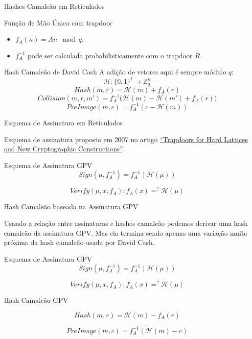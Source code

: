 \documentclass{beamer}
\begin{document}
\begin{frame}{Hashes Camaleão em Reticulados}

\begin{block}{Função de Mão Única com trapdoor}
\begin{itemize}
    \item $f_A(n) = An \mod q$.
    \item $f_A^{-1}$ pode ser calculada probabilisticamente com o
    trapdoor $R$.
\end{itemize}
\end{block}
    
    \begin{block}{Hash Camaleão de David Cash}
    A adição de vetores aqui é sempre módulo $q$:
    $$
    \mathcal{H}:\{0,1\}^l \rightarrow \mathbb{Z}_q^{n}
    $$
    $$
    Hash(m, r) = \mathcal{H}(m) + f_A(r)
    $$
    $$
    Collision(m, r, m') = f_A^{-1}\big(\mathcal{H}(m)-\mathcal{H}(m')+f_A(r)\big)
    $$
    $$
    PreImage(m, c) = f_A^{-1}(c - \mathcal{H}(m))
    $$
    \end{block}
\end{frame}

\begin{frame}{Esquema de Assinatura em Reticulados}

Esquema de assinatura proposto em 2007 no artigo \href{https://www.cs.toronto.edu/~vinodv/trapcvp.pdf}{``Trapdoors for Hard Lattices and New Cryptographic Constructions''}.

    \begin{block}{Esquema de Assinatura GPV}
    $$
    Sign(\mu, f_A^{-1}) = f_A^{-1}(\mathcal{H}(\mu))
    $$
    
    $$
    Verify(\mu, x, f_A):  f_A(x) =^{?} \mathcal{H}(\mu)
    $$
    
    \end{block}
\end{frame}

\begin{frame}{Hash Camaleão  baseada na Assinatura GPV}
    
    Usando a relação entre assinaturas e hashes camaleão podemos
    derivar uma hash camaleão da assinatura GPV. Mas ela termina
    sendo apenas uma variação muito próxima da hash camaleão
    usada por David Cash.
    
    \begin{block}{Esquema de Assinatura GPV}
    $$
    Sign(\mu, f_A^{-1}) = f_A^{-1}(\mathcal{H}(\mu))
    $$
    
    $$
    Verify(\mu, x, f_A):  f_A(x) =^{?} \mathcal{H}(\mu)
    $$
    
    \end{block}
    
    \begin{block}{Hash Camaleão GPV}
    
    $$
    Hash(m, r) = \mathcal{H}(m) - f_A(r)
    $$
    
    $$
    PreImage(m, c) = f_A^{-1}(\mathcal{H}(m) - c)
    $$
    
    \end{block}
    
\end{frame}
\end{document}
